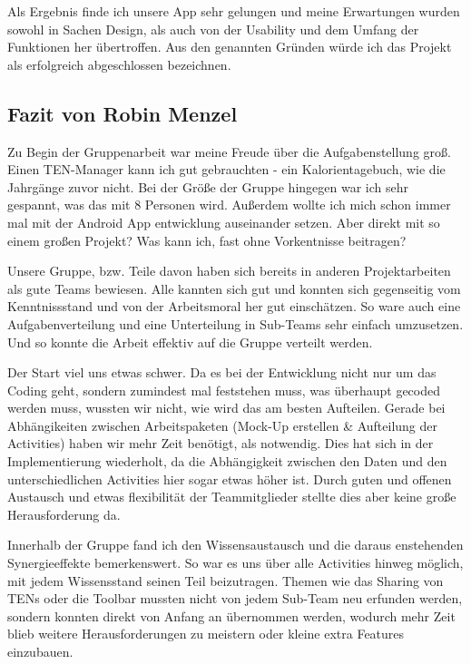 Als Ergebnis finde ich unsere App sehr gelungen und meine Erwartungen wurden sowohl in Sachen Design, als auch von der Usability und dem Umfang der Funktionen her übertroffen. Aus den genannten Gründen würde ich das Projekt als erfolgreich abgeschlossen bezeichnen.

\subsection{Fazit von Robin Menzel}

Zu Begin der Gruppenarbeit war meine Freude über die Aufgabenstellung groß. Einen TEN-Manager kann ich gut gebrauchten - ein Kalorientagebuch, wie die Jahrgänge zuvor nicht. Bei der Größe der Gruppe hingegen war ich sehr gespannt, was das mit 8 Personen wird. Außerdem wollte ich mich schon immer mal mit der Android App entwicklung auseinander setzen. Aber direkt mit so einem großen Projekt? Was kann ich, fast ohne Vorkentnisse beitragen?

Unsere Gruppe, bzw. Teile davon haben sich bereits in anderen Projektarbeiten als gute Teams bewiesen. Alle kannten sich gut und konnten sich gegenseitig vom Kenntnissstand und von der Arbeitsmoral her gut einschätzen. So ware auch eine Aufgabenverteilung und eine Unterteilung in Sub-Teams sehr einfach umzusetzen. Und so konnte die Arbeit effektiv auf die Gruppe verteilt werden.

Der Start viel uns etwas schwer. Da es bei der Entwicklung nicht nur um das Coding geht, sondern zumindest mal feststehen muss, was überhaupt gecoded werden muss, wussten wir nicht, wie wird das am besten Aufteilen. Gerade bei Abhängikeiten zwischen Arbeitspaketen (Mock-Up erstellen \& Aufteilung der Activities) haben wir mehr Zeit benötigt, als notwendig. Dies hat sich in der Implementierung wiederholt, da die Abhängigkeit zwischen den Daten und den unterschiedlichen Activities hier sogar etwas höher ist. Durch guten und offenen Austausch und etwas flexibilität der Teammitglieder stellte dies aber keine große Herausforderung da.

Innerhalb der Gruppe fand ich den Wissensaustausch und die daraus enstehenden Synergieeffekte bemerkenswert. So war es uns über alle Activities hinweg möglich, mit jedem Wissensstand seinen Teil beizutragen. Themen wie das Sharing von TENs oder die Toolbar mussten nicht von jedem Sub-Team neu erfunden werden, sondern konnten direkt von Anfang an übernommen werden, wodurch mehr Zeit blieb weitere Herausforderungen zu meistern oder kleine extra Features einzubauen.

